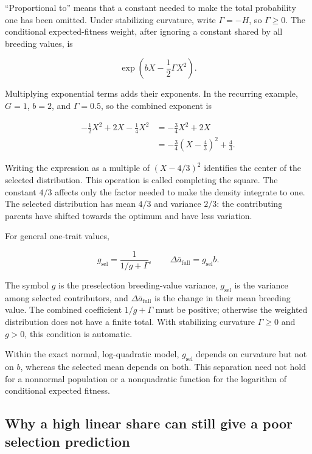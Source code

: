 \documentclass[11pt]{article}
\begin{document}
``Proportional to'' means that a constant needed to make the total probability
one has been omitted.  Under stabilizing curvature, write $\Gamma=-H$, so
$\Gamma\geq0$.  The conditional expected-fitness weight, after ignoring a
constant shared by all breeding values, is

\begin{equation}
\exp\left(bX-\frac12\Gamma X^2\right).
\end{equation}

Multiplying exponential terms adds their exponents.  In the recurring
example, $G=1$, $b=2$, and $\Gamma=0.5$, so the combined exponent is

\begin{align}
-\frac12X^2+2X-\frac14X^2
&=-\frac34X^2+2X\nonumber\\
&=-\frac34\left(X-\frac43\right)^2+\frac43.
\end{align}

Writing the expression as a multiple of $(X-4/3)^2$ identifies the center of the selected distribution. This operation is called completing the square. The constant $4/3$ affects only the factor needed to make the density integrate to one. The selected distribution has mean $4/3$ and variance $2/3$: the contributing parents have shifted towards the optimum and have less variation.

For general one-trait values,

\begin{equation}
g_{\mathrm{sel}}=\frac{1}{1/g+\Gamma},
\qquad
\Delta\bar a_{\mathrm{full}}=g_{\mathrm{sel}}b.
\label{eq:guide-selected-moments}
\end{equation}

The symbol $g$ is the preselection breeding-value variance,
$g_{\mathrm{sel}}$ is the variance among selected contributors, and
$\Delta\bar a_{\mathrm{full}}$ is the change in their mean breeding value.
The combined coefficient $1/g+\Gamma$ must be positive; otherwise the
weighted distribution does not have a finite total.  With stabilizing
curvature $\Gamma\geq0$ and $g>0$, this condition is automatic.

Within the exact normal, log-quadratic model, $g_{\mathrm{sel}}$ depends on
curvature but not on $b$, whereas the selected mean depends on both.  This
separation need not hold for a nonnormal population or a nonquadratic
function for the logarithm of conditional expected fitness.

\subsection{Why a high linear share can still give a poor selection prediction}
\end{document}
